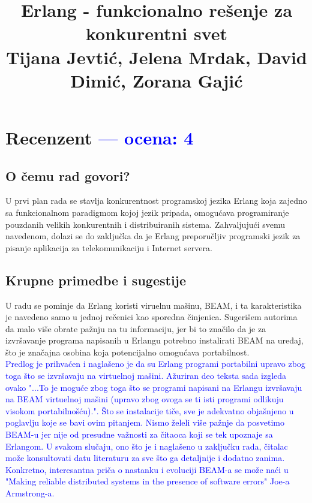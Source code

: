 \documentclass[a4paper]{report}
\newcommand{\odgovor}[1]{\textcolor{blue}{#1}}
\begin{document}
\title{Erlang - funkcionalno rešenje za konkurentni svet\\ \small{Tijana Jevtić, Jelena Mrdak, David Dimić, Zorana Gajić}}

\maketitle

\tableofcontents

\chapter{Recenzent \odgovor{--- ocena: 4} }


\section{O čemu rad govori?}
U prvi plan rada se stavlja konkurentnost programskoj jezika Erlang koja zajedno sa funkcionalnom paradigmom kojoj jezik pripada, omogućava programiranje pouzdanih velikih konkurentnih i distribuiranih sistema. Zahvaljujući svemu navedenom, dolazi se do zaključka da je Erlang preporučljiv programski jezik za pisanje aplikacija za telekomunikaciju i Internet servera.
\section{Krupne primedbe i sugestije}
U radu se pominje da Erlang koristi viruelnu mašinu, BEAM, i ta karakteristika je navedeno samo u jednoj rečenici kao sporedna činjenica. Sugerišem autorima da malo više obrate pažnju na tu informaciju, jer bi to značilo da je za izvršavanje programa napisanih u Erlangu potrebno instalirati BEAM na uređaj, što je značajna osobina koja potencijalno omogućava portabilnost.\\

\odgovor{Predlog je prihvaćen i naglašeno je da su Erlang programi portabilni upravo zbog toga što se izvršavaju na virtuelnoj mašini. Ažuriran deo teksta sada izgleda ovako "...To je moguće zbog toga što se programi napisani na Erlangu izvršavaju na BEAM virtuelnoj mašini (upravo zbog ovoga se ti isti programi odlikuju visokom portabilnošću).". Što se instalacije tiče, sve je adekvatno objašnjeno u poglavlju koje se bavi ovim pitanjem. Nismo želeli više pažnje da posvetimo BEAM-u jer nije od presudne važnosti za čitaoca koji se tek upoznaje sa Erlangom. U svakom slučaju, ono što je i naglašeno u zaključku rada, čitalac može konsultovati datu literaturu za sve što ga detaljnije i dodatno zanima. Konkretno, interesantna priča o nastanku i evoluciji BEAM-a se može naći u "Making reliable distributed systems in the presence of software errors" Joe-a Armstrong-a.}
\end{document}
